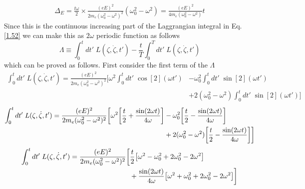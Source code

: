 \begin{equation} \label{3.5}
  \begin{aligned}
    \Delta_E =
    \frac{t\omega}{2} \times
    \frac{(eE)^2}{2m_e(\omega_0^2 - \omega^2)^2}
    (\omega_0^2 - \omega^2) =
    \frac{(eE)^2}{4m_e(\omega_0^2 - \omega^2)} t
  \end{aligned}
\end{equation}
Since this is the continuous increasing part of the Laggrangian integral in Eq. \eqref{1.52} we can make this as $2\omega$ periodic function as follows
\begin{equation} \label{3.6}
    \Lambda\equiv
    \int_0^t dt' \; L(\zeta,\dot{\zeta},t') -
    \frac{t}{T} \int_0^T dt' \; L(\zeta,\dot{\zeta},t')
\end{equation}
which can be proved as follows. First consider the first term of the $\Lambda$
\begin{equation} \label{3.7}
  \begin{aligned}
    \int_0^t dt' \; L(\zeta,\dot{\zeta},t') =
    \frac{(eE)^2}{2m_e(\omega_0^2 - \omega^2)^2}
    \bigg[
    \omega^2
    \int_0^t dt' \; \cos[2](\omega t')
    & -
    \omega_0^2
    \int_0^t dt'\; \sin[2](\omega t') \\
    & +
    2(\omega_0^2 - \omega^2) \int_0^t dt'\; \sin[2](\omega t')
    \bigg]
  \end{aligned}
\end{equation}
\begin{equation} \label{3.8}
  \begin{aligned}
    \int_0^t dt' \; L(\zeta,\dot{\zeta},t') =
    \frac{(eE)^2}{2m_e(\omega_0^2 - \omega^2)^2}
    \bigg[
    \omega^2
    \qty[\frac{t}{2} + \frac{\sin(2\omega t)}{4\omega}]
    & -
    \omega_0^2
    \qty[\frac{t}{2} - \frac{\sin(2\omega t)}{4\omega}] \\
    & +
    2(\omega_0^2 - \omega^2)
    \qty[\frac{t}{2} - \frac{\sin(2\omega t)}{4\omega}]
    \bigg]
  \end{aligned}
\end{equation}
\begin{equation} \label{3.9}
  \begin{aligned}
    \int_0^t dt' \; L(\zeta,\dot{\zeta},t')  =
    \frac{(eE)^2}{2m_e(\omega_0^2 - \omega^2)^2}
    \bigg[&
    \frac{t}{2}
    \qty[\omega^2 - \omega_0^2 + 2\omega_0^2 - 2\omega^2] \\
    & +
    \frac{\sin(2\omega t)}{4\omega}
    \qty[\omega^2 + \omega_0^2 + 2\omega_0^2 - 2\omega^2]
    \bigg]
  \end{aligned}
\end{equation}
